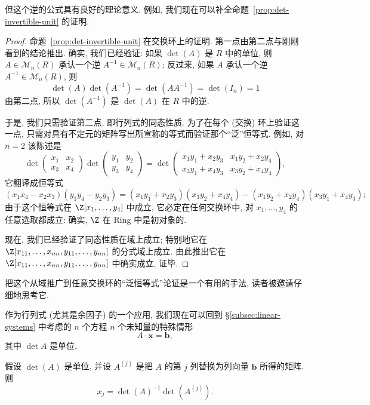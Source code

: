 但这个逆的公式具有良好的理论意义. 例如, 我们现在可以补全命题~\ref{prop:det-invertible-unit} 的证明.

\begin{proof}
命题~\ref{prop:det-invertible-unit} 在交换环上的证明. 第一点由第二点与刚刚看到的结论推出. 确实, 我们已经验证: 如果 $\det(A)$ 是 $R$ 中的单位, 则 $A\in\mathcal{M}_n(R)$ 承认一个逆 $A^{-1}\in\mathcal{M}_n(R)$; 反过来, 如果 $A$ 承认一个逆 $A^{-1}\in\mathcal{M}_n(R)$, 则
\[
\det(A)\det(A^{-1})=\det(AA^{-1})=\det(I_n)=1
\]
由第二点, 所以 $\det(A^{-1})$ 是 $\det(A)$ 在 $R$ 中的逆.

于是, 我们只需验证第二点, 即行列式的同态性质. 为了在每个 (交换) 环上验证这一点, 只需对具有不定元的矩阵写出所宣称的等式而验证那个``泛''恒等式. 例如, 对 $n=2$ 该陈述是
\[
\det\begin{pmatrix} x_1&x_2\\ x_3&x_4\end{pmatrix}\det\begin{pmatrix} y_1&y_2\\ y_3&y_4\end{pmatrix}
=\det\begin{pmatrix} x_1y_1+x_2y_3&x_1y_2+x_2y_4\\ x_3y_1+x_4y_3&x_3y_2+x_4y_4\end{pmatrix},
\]
它翻译成恒等式
\[
(x_1x_4-x_2x_3)(y_1y_4-y_2y_3)=(x_1y_1+x_2y_3)(x_3y_2+x_4y_4)-(x_1y_2+x_2y_4)(x_3y_1+x_4y_3);
\]
由于这个恒等式在 $\Z[x_1,\ldots,y_4]$ 中成立, 它必定在任何交换环中, 对 $x_1,\ldots,y_4$ 的任意选取都成立: 确实, $\Z$ 在 Ring 中是初对象的.

现在, 我们已经验证了同态性质在域上成立; 特别地它在 $\Z[x_{11},\ldots,x_{nn},y_{11},\ldots,y_{nn}]$ 的分式域上成立. 由此推出它在 $\Z[x_{11},\ldots,x_{nn},y_{11},\ldots,y_{nn}]$ 中确实成立, 证毕.
\end{proof}

把这个从域推广到任意交换环的``泛恒等式''论证是一个有用的手法, 读者被邀请仔细地思考它.

作为行列式 (尤其是余因子) 的一个应用, 我们现在可以回到 §\ref{subsec:linear-systems} 中考虑的 $n$ 个方程 $n$ 个未知量的特殊情形
\[
A\cdot\mathbf{x}=\mathbf{b},
\]
其中 $\det A$ 是单位.

\begin{proposition}[Cramer 法则]\label{prop:cramers-rule}
假设 $\det(A)$ 是单位, 并设 $A^{(j)}$ 是把 $A$ 的第 $j$ 列替换为列向量 $\mathbf{b}$ 所得的矩阵. 则
\[
x_j=\det(A)^{-1}\det(A^{(j)}).
\]
\end{proposition}

